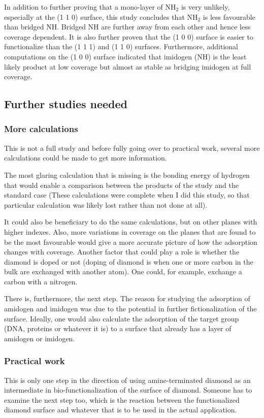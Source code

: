\documentclass[10pt,a4paper]{article}
\begin{document}
In addition to further proving that a mono-layer of NH$_2$ is very unlikely, especially at the (1 1 0) surface, this study concludes that NH$_2$ is less favourable than bridged NH. Bridged NH are further away from each other and hence less coverage dependent. It is also further proven that the (1 0 0) surface is easier to functionalize than the (1 1 1) and (1 1 0) surfaces. Furthermore, additional computations on the (1 0 0) surface indicated that imidogen (NH) is the least likely product at low coverage but almost as stable as bridging imidogen at full coverage. 

\subsection{Further studies needed}
\subsubsection{More calculations}
This is not a full study and before fully going over to practical work, several more calculations could be made to get more information. 

The most glaring calculation that is missing is the bonding energy of hydrogen that would enable a comparison between the products of the study and the standard case (These calculations were complete when I did this study, so that particular calculation was likely lost rather than not done at all). 

It could also be beneficiary to do the same calculations, but on other planes with higher indexes. Also, more variations in coverage on the planes that are found to be the most favourable would give a more accurate picture of how the adsorption changes with coverage. Another factor that could play a role is whether the diamond is doped or not (doping of diamond is when one or more carbon in the bulk are exchanged with another atom). One could, for example, exchange a carbon with a nitrogen.

There is, furthermore, the next step. The reason for studying the adsorption of amidogen and imidogen was due to the potential in further fictionalization of the surface. Ideally, one would also calculate the adsorption of the target group (DNA, proteins or whatever it is) to a surface that already has a layer of amidogen or imidogen.

\subsubsection{Practical work}
This is only one step in the direction of using amine-terminated diamond as an intermediate in bio-functionalization of the surface of diamond. Someone has to examine the next step too, which is the reaction between the functionalized diamond surface and whatever that is to be used in the actual application. 
\end{document}

